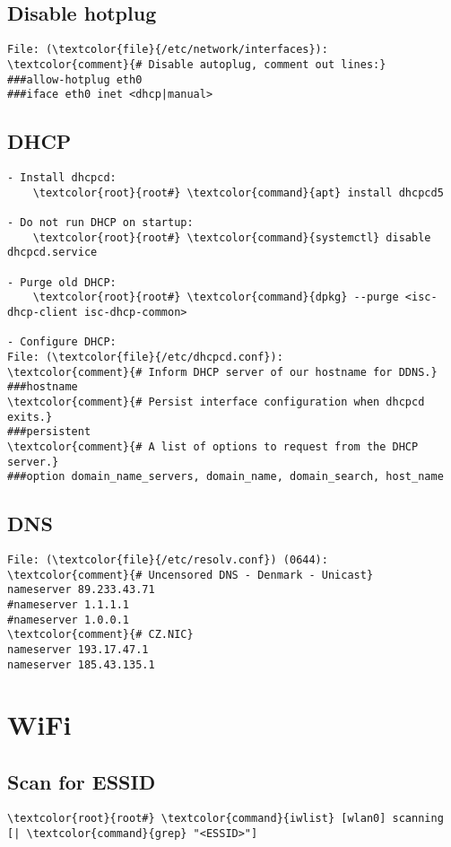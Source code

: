 \documentclass[10pt, a4paper, onecolumn, openany]{book} %
\begin{document}
\subsection{Disable hotplug}
\begin{Verbatim}[commandchars=\\\{\}]
File: (\textcolor{file}{/etc/network/interfaces}):
\textcolor{comment}{# Disable autoplug, comment out lines:}
###allow-hotplug eth0
###iface eth0 inet <dhcp|manual>
\end{Verbatim}
\subsection{DHCP}
\begin{Verbatim}[commandchars=\\\{\}]
- Install dhcpcd:
    \textcolor{root}{root#} \textcolor{command}{apt} install dhcpcd5

- Do not run DHCP on startup:
    \textcolor{root}{root#} \textcolor{command}{systemctl} disable dhcpcd.service

- Purge old DHCP:
    \textcolor{root}{root#} \textcolor{command}{dpkg} --purge <isc-dhcp-client isc-dhcp-common>
    
- Configure DHCP:
File: (\textcolor{file}{/etc/dhcpcd.conf}):
\textcolor{comment}{# Inform DHCP server of our hostname for DDNS.}
###hostname
\textcolor{comment}{# Persist interface configuration when dhcpcd exits.}
###persistent
\textcolor{comment}{# A list of options to request from the DHCP server.}
###option domain_name_servers, domain_name, domain_search, host_name
\end{Verbatim}

\subsection{DNS}
\begin{Verbatim}[commandchars=\\\{\}]
File: (\textcolor{file}{/etc/resolv.conf}) (0644):
\textcolor{comment}{# Uncensored DNS - Denmark - Unicast}
nameserver 89.233.43.71
#nameserver 1.1.1.1
#nameserver 1.0.0.1
\textcolor{comment}{# CZ.NIC}
nameserver 193.17.47.1
nameserver 185.43.135.1
\end{Verbatim}


\section{WiFi}
\subsection{Scan for ESSID}
\begin{Verbatim}[commandchars=\\\{\}]
    \textcolor{root}{root#} \textcolor{command}{iwlist} [wlan0] scanning [| \textcolor{command}{grep} "<ESSID>"]
\end{Verbatim}
\end{document}
